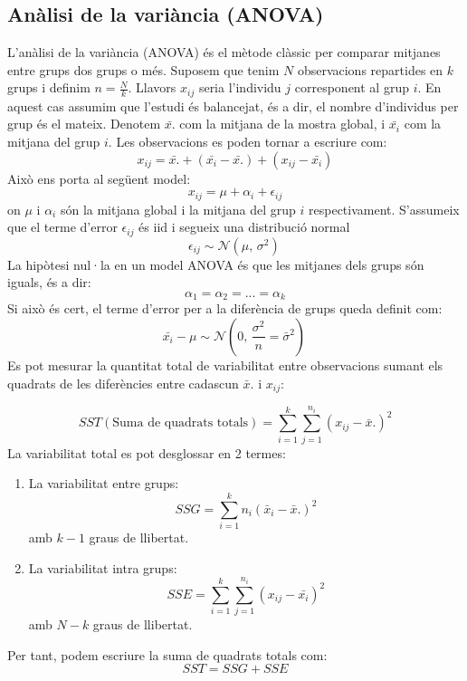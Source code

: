 \documentclass[english]{article}
\begin{document}
\subsection{Anàlisi de la variància (ANOVA)}
L'anàlisi de la variància (ANOVA) és el mètode clàssic per comparar mitjanes entre grups dos grups o més. Suposem que tenim $N$ observacions repartides en $k$ grups i definim $n=\frac{N}{k}$. Llavors $x_{ij}$ seria l'individu $j$ corresponent al grup $i$. En aquest cas assumim que l'estudi és balancejat, és a dir, el nombre d'individus per grup és el mateix. Denotem $\bar{x.}$ com la mitjana de la mostra global, i $\bar{x_{i}}$ com la mitjana del grup $i$.
Les observacions es poden tornar a escriure com:
\begin{equation*}
x_{ij} = \bar{x.} + (\bar{x_{i}} - \bar{x.}) + (x_{ij} - \bar{x_{i}})
\end{equation*}
Això ens porta al següent model:
\begin{equation*}
x_{ij} = \mu + \alpha_{i} + \epsilon_{ij}
\end{equation*}
on $\mu$ i $\alpha_{i}$ són la mitjana global i la mitjana del grup $i$ respectivament. S'assumeix que el terme d'error $\epsilon_{ij}$ és iid i segueix una distribució normal
\begin{equation*}
\epsilon_{ij} \sim \mathcal{N}(\mu,\,\sigma^{2})\,
\end{equation*}
La hipòtesi nul·la en un model ANOVA és que les mitjanes dels grups són iguals, és a dir:
\begin{equation*}
\alpha_1 = \alpha_2 = ... = \alpha_k
\end{equation*}
Si això és cert, el terme d'error per a la diferència de grups queda definit com:
\begin{equation*}
\bar{x_{i}} - \mu \sim \mathcal{N}(0,\,\frac{\sigma^{2}}{n}=\bar{\sigma}^2)\,
\end{equation*}
Es pot mesurar la quantitat total de variabilitat entre observacions sumant els quadrats de les diferències entre cadascun $\bar{x}.$ i $x_{ij}$:

\begin{equation*}
SST(\text{Suma de quadrats totals}) = \sum_{i=1}^{k} \sum_{j=1}^{n_{i}} (x_{ij} - \bar{x}.)^2
\end{equation*}
La variabilitat total es pot desglossar en 2 termes:
\begin{enumerate}
\item La variabilitat entre grups:
\begin{equation*}
SSG = \sum_{i=1}^{k} n_{i}(\bar{x}_{i} - \bar{x}.)^2
\end{equation*}
amb $k-1$ graus de llibertat.
\item La variabilitat intra grups:
\begin{equation*}
SSE = \sum_{i=1}^{k} \sum_{j=1}^{n_{i}} (x_{ij} - \bar{x_{i}})^2
\end{equation*}
amb $N-k$ graus de llibertat.
\end{enumerate}
Per tant, podem escriure la suma de quadrats totals com:
\begin{equation*}
SST = SSG + SSE
\end{equation*}
\end{document}
